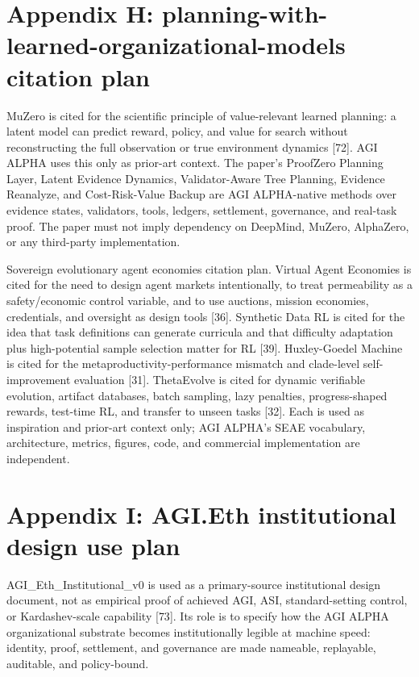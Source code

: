 \section{Appendix H: planning-with-learned-organizational-models
citation
plan}\label{appendix-h-planning-with-learned-organizational-models-citation-plan}

MuZero is cited for the scientific principle of value-relevant learned
planning: a latent model can predict reward, policy, and value for
search without reconstructing the full observation or true environment
dynamics {[}72{]}. AGI ALPHA uses this only as prior-art context. The
paper's ProofZero Planning Layer, Latent Evidence Dynamics,
Validator-Aware Tree Planning, Evidence Reanalyze, and Cost-Risk-Value
Backup are AGI ALPHA-native methods over evidence states, validators,
tools, ledgers, settlement, governance, and real-task proof. The paper
must not imply dependency on DeepMind, MuZero, AlphaZero, or any
third-party implementation.

Sovereign evolutionary agent economies citation plan. Virtual Agent
Economies is cited for the need to design agent markets intentionally,
to treat permeability as a safety/economic control variable, and to use
auctions, mission economies, credentials, and oversight as design tools
{[}36{]}. Synthetic Data RL is cited for the idea that task definitions
can generate curricula and that difficulty adaptation plus
high-potential sample selection matter for RL {[}39{]}. Huxley-Goedel
Machine is cited for the metaproductivity-performance mismatch and
clade-level self-improvement evaluation {[}31{]}. ThetaEvolve is cited
for dynamic verifiable evolution, artifact databases, batch sampling,
lazy penalties, progress-shaped rewards, test-time RL, and transfer to
unseen tasks {[}32{]}. Each is used as inspiration and prior-art context
only; AGI ALPHA's SEAE vocabulary, architecture, metrics, figures, code,
and commercial implementation are independent.

\section{Appendix I: AGI.Eth institutional design use
plan}\label{appendix-i-agi.eth-institutional-design-use-plan}

AGI\_Eth\_Institutional\_v0 is used as a primary-source institutional
design document, not as empirical proof of achieved AGI, ASI,
standard-setting control, or Kardashev-scale capability {[}73{]}. Its
role is to specify how the AGI ALPHA organizational substrate becomes
institutionally legible at machine speed: identity, proof, settlement,
and governance are made nameable, replayable, auditable, and
policy-bound.

